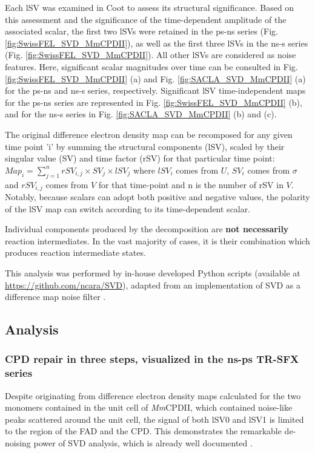 Each lSV was examined in Coot \parencite{emsleyFeaturesDevelopmentCoot2010} to assess its structural significance. Based on this assessment and the significance of the time-dependent amplitude of the associated scalar, the first two lSVs were retained in the ps-ns series (Fig. \ref{fig:SwissFEL_SVD_MmCPDII}), as well as the first three lSVs in the ns-\textmu s series (Fig. \ref{fig:SwissFEL_SVD_MmCPDII}). All other lSVs are considered as noise features. Here, significant scalar magnitudes over time can be consulted in Fig. \ref{fig:SwissFEL_SVD_MmCPDII} (a) and Fig. \ref{fig:SACLA_SVD_MmCPDII} (a) for the ps-ns and ns-\textmu s series, respectively. Significant lSV time-independent maps for the ps-ns series are represented in Fig. \ref{fig:SwissFEL_SVD_MmCPDII} (b), and for the ns-\textmu s series in Fig. \ref{fig:SACLA_SVD_MmCPDII} (b) and (c). 

The original difference electron density map can be recomposed for any given time point 'i' by summing the structural components (lSV), scaled by their singular value (SV) and time factor (rSV) for that particular time point: \(Map_i=\sum_{j=1}^{n} rSV_{i,j} \times SV_{j} \times lSV_{j}\) where \(lSV_{i}\) comes from \(U\), \(SV_{i}\) comes from \(\sigma\) and \(rSV_{i,j}\) comes from \(V\) for that time-point and n is the number of rSV in \(V\). Notably, because scalars can adopt both positive and negative values, the polarity of the lSV map can switch according to its time-dependent scalar.

Individual components produced by the decomposition are \textbf{not necessarily} reaction intermediates. In the vast majority of cases, it is their combination which produces reaction intermediate states. 

This analysis was performed by in-house developed Python scripts (available at \url{https://github.com/ncara/SVD}), adapted from an implementation of SVD as a difference map noise filter \parencite{dodsUltrafastStructuralChanges2021}.

\subsection{Analysis} \label{sec:SVD_MmCPDII}

\subsubsection{CPD repair in three steps, visualized in the ns-ps TR-SFX series}
Despite originating from difference electron density maps calculated for the two monomers contained in the unit cell of \textit{Mm}CPDII, which contained noise-like peaks scattered around the unit cell, the signal of both lSV0 and lSV1 is limited to the region of the FAD and the CPD. This demonstrates the remarkable de-noising power of SVD analysis, which is already well documented \parencite{schmidtApplicationSingularValue2003, dodsUltrafastStructuralChanges2021, vallejosAppraisingProteinConformational2024}. 

